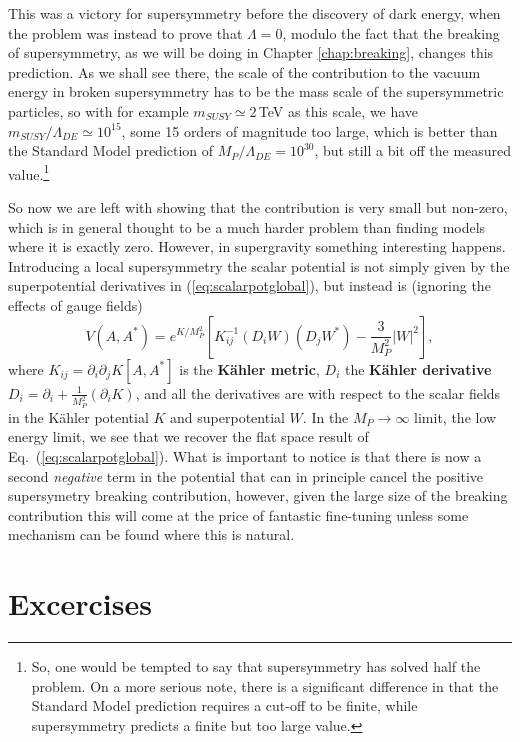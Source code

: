 \documentclass[notes.tex]{subfiles}
\begin{document}
This was a victory for supersymmetry before the discovery of dark energy, when the problem was instead to prove that $\Lambda=0$, modulo the fact that the breaking of supersymmetry, as we will be doing in Chapter \ref{chap:breaking}, changes this prediction. As we shall see there, the scale of the contribution to the vacuum energy in broken supersymmetry has to be the mass scale of the supersymmetric particles, so with for example $m_{SUSY} \simeq 2$\,TeV as this scale, we have $m_{SUSY}/\Lambda_{DE} \simeq 10^{15}$, some 15 orders of magnitude too large, which is better than the Standard Model prediction of $M_P/\Lambda_{DE} = 10^{30}$, but still a bit off the measured value.\footnote{So, one would be tempted to say that supersymmetry has solved half the problem. On a more serious note, there is a significant difference in that the Standard Model prediction requires a cut-off to be finite, while supersymmetry predicts a finite but too large value.}


So now we are left with showing that the contribution is very small but non-zero, which is in general thought to be a much harder problem than finding models where it  is exactly zero.
However, in supergravity something interesting happens. Introducing a local supersymmetry the scalar potential is not simply given by the superpotential derivatives in (\ref{eq:scalarpotglobal}), but instead is (ignoring the effects of gauge fields)
\begin{equation}
V(A,A^*) = e^{K/M_P^2}\left[K^{-1}_{ij}(D_iW)(D_jW^*)-\frac{3}{M_P^2}|W|^2\right],
\end{equation}
where $K_{ij}=\partial_i\partial_jK[A,A^*]$ is the {\bf Kähler metric},  $D_i$ the {\bf Kähler derivative} $D_i = \partial_i +\frac{1}{M_P^2}(\partial_iK)$, and all the derivatives are with respect to the scalar fields in the Kähler potential $K$ and superpotential $W$. In the $M_P\to \infty$ limit, the low energy limit, we see that we recover the flat space result of Eq.~(\ref{eq:scalarpotglobal}). What is important to notice is that  there is now a second {\it negative} term in the potential that can in principle cancel the positive supersymetry breaking contribution, however, given the large size of the breaking contribution this will come at the price of fantastic fine-tuning unless some mechanism can be found where this is natural.



\section{Excercises}
\end{document}

